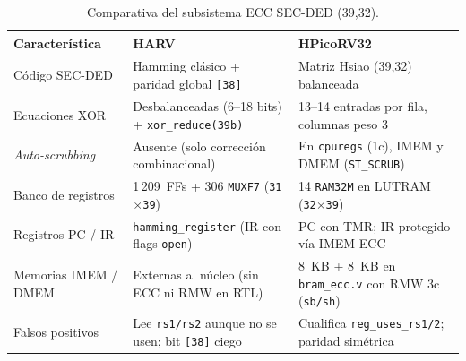 \documentclass[a4paper,10pt]{article}
\begin{document}
\begin{table}[htbp]
  \centering
  \footnotesize
  \caption{Comparativa del subsistema ECC SEC-DED (39,32).}
  \label{tab:ecc}
  \begin{tabularx}{\textwidth}{@{}lYY@{}}
    \toprule
    \textbf{Característica} & \textbf{HARV} & \textbf{HPicoRV32} \\
    \midrule
    Código SEC-DED & Hamming clásico + paridad global \texttt{[38]} & Matriz Hsiao (39,32)~\cite{hsiao1970} balanceada \\
    Ecuaciones XOR & Desbalanceadas (6--18 bits) + \texttt{xor\_reduce(39b)} & 13--14 entradas por fila, columnas peso 3 \\
    \textit{Auto-scrubbing} & Ausente (solo corrección combinacional) & En \texttt{cpuregs} (1c), IMEM y DMEM (\texttt{ST\_SCRUB}) \\
    Banco de registros & 1\,209~FFs + 306 \texttt{MUXF7} (\texttt{31$\times$39}) & 14 \texttt{RAM32M} en LUTRAM (\texttt{32$\times$39}) \\
    Registros PC / IR & \texttt{hamming\_register} (IR con flags \texttt{open}) & PC con TMR; IR protegido vía IMEM ECC \\
    Memorias IMEM / DMEM & Externas al núcleo (sin ECC ni RMW en RTL) & 8~KB + 8~KB en \texttt{bram\_ecc.v} con RMW 3c (\texttt{sb/sh}) \\
    Falsos positivos & Lee \texttt{rs1/rs2} aunque no se usen; bit \texttt{[38]} ciego & Cualifica \texttt{reg\_uses\_rs1/2}; paridad simétrica \\
    \bottomrule
  \end{tabularx}
\end{table}
\end{document}
